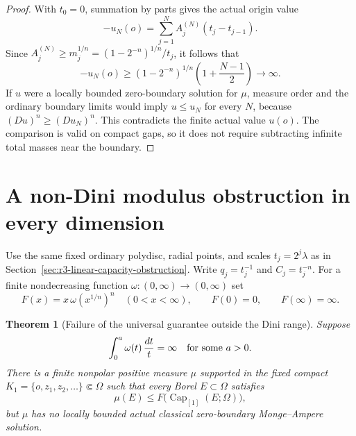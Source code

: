 \documentclass[11pt,a4paper]{article}
\numberwithin{equation}{section}
\newtheorem{theorem}{Theorem}[section]
\theoremstyle{definition}
\theoremstyle{remark}
\begin{document}
\begin{proof}
With $t_0=0$, summation by parts gives the actual origin value
\[
 -u_N(o)=\sum_{j=1}^N A_j^{(N)}(t_j-t_{j-1}).
\]
Since $A_j^{(N)}\geq m_j^{1/n}
 =(1-2^{-n})^{1/n}/t_j$, it follows that
\[
 -u_N(o)\geq(1-2^{-n})^{1/n}
                  \left(1+\frac{N-1}{2}\right)\longrightarrow\infty.
\]
If $u$ were a locally bounded zero-boundary solution for $\mu$,
measure order and the ordinary boundary limits would imply
$u\leq u_N$ for every $N$, because
$(Du)^n\geq(Du_N)^n$. This contradicts the finite actual value
$u(o)$. The comparison is valid on compact gaps, so it does
not require subtracting infinite total masses near the boundary.
\end{proof}



\section{A non-Dini modulus obstruction in every dimension}
\label{sec:r3-nondini-capacity-obstruction}

Use the same fixed ordinary polydisc, radial points, and scales
$t_j=2^j\lambda$ as in Section~\ref{sec:r3-linear-capacity-obstruction}.
Write $q_j=t_j^{-1}$ and $C_j=t_j^{-n}$. For a finite nondecreasing
function $\omega:(0,\infty)\to(0,\infty)$ set
\[
 F(x)=x\,\omega(x^{1/n})^n\quad(0<x<\infty),\qquad
 F(0)=0,\qquad F(\infty)=\infty.
\]

\begin{theorem}[Failure of the universal guarantee outside the Dini range]
\label{thm:r3-nondini-modulus-obstruction}
Suppose
\begin{equation}
 \int_0^a\omega(t)\,\frac{dt}{t}=\infty
 \quad\hbox{for some }a>0.
 \label{eq:r3-nondini-hypothesis}
\end{equation}
There is a finite nonpolar positive measure $\mu$ supported in
the fixed compact $K_1=\{o,z_1,z_2,\ldots\}\Subset\Omega$ such that
every Borel $E\subset\Omega$ satisfies
\begin{equation}
 \mu(E)\leq F\bigl(\operatorname{Cap}_{[1]}(E;\Omega)\bigr),
 \label{eq:r3-nondini-growth}
\end{equation}
but $\mu$ has no locally bounded actual classical zero-boundary
Monge--Ampere solution.
\end{theorem}
\end{document}
